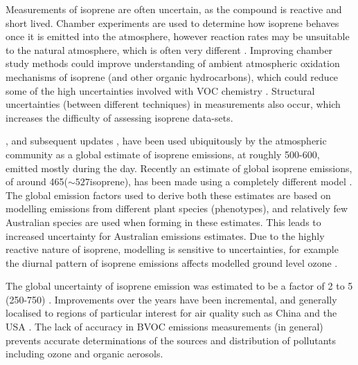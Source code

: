     Measurements of isoprene are often uncertain, as the compound is reactive and short lived.
    Chamber experiments are used to determine how isoprene behaves once it is emitted into the atmosphere, however reaction rates may be unsuitable to the natural atmosphere, which is often very different \parencite{Kanakidou2005,Nguyen2014}.
    Improving chamber study methods could improve understanding of ambient atmospheric oxidation mechanisms of isoprene (and other organic hydrocarbons), which could reduce some of the high uncertainties involved with VOC chemistry \parencite{Nguyen2014}.
    Structural uncertainties (between different techniques) in measurements also occur, which increases the difficulty of assessing isoprene data-sets.
    
    \textcite{Guenther1995}, and subsequent updates \parencite{Guenther2000,Guenther2006,Guenther2012}, have been used ubiquitously by the atmospheric community as a global estimate of isoprene emissions, at roughly 500-600\tgpyr, emitted mostly during the day.
    Recently an estimate of global isoprene emissions, of around 465\tgcpyr ($\sim 527$\tgpyr isoprene), has been made using a completely different model \parencite{Messina2016}.
    The global emission factors used to derive both these estimates are based on modelling emissions from different plant species (phenotypes), and relatively few Australian species are used when forming in these estimates.
    This leads to increased uncertainty for Australian emissions estimates.
    Due to the highly reactive nature of isoprene, modelling is sensitive to uncertainties, for example the diurnal pattern of isoprene emissions affects modelled ground level ozone \parencite{Hewitt2011, Fan2004}.
    
    The global uncertainty of isoprene emission was estimated to be a factor of 2 to 5 (250-750\tgpyr) \parencite{Kanakidou2005}.
    Improvements over the years have been incremental, and generally localised to regions of particular interest for air quality such as China and the USA \parencite{Guenther2012,Jiang2018}.
    The lack of accuracy in BVOC emissions measurements (in general) prevents accurate determinations of the sources and distribution of pollutants including ozone and organic aerosols.
    

